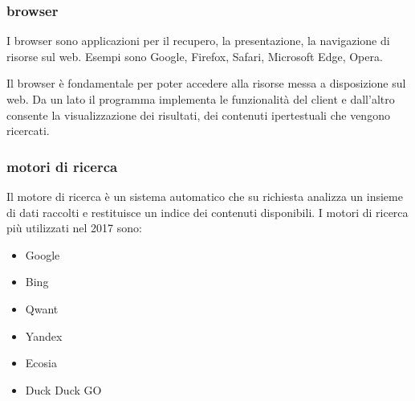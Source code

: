      
     \subsubsection{browser}
     I browser sono applicazioni per il recupero, la presentazione, la navigazione di risorse sul web. Esempi sono  Google, Firefox, Safari, Microsoft Edge, Opera.\par 
     Il browser è fondamentale per poter accedere alla risorse messa a disposizione sul web. Da un lato il programma implementa le funzionalità del client e dall'altro consente la visualizzazione dei risultati, dei contenuti ipertestuali che vengono ricercati.\par

     \subsubsection{motori di ricerca}
     Il motore di ricerca è un sistema automatico che su richiesta analizza un insieme di dati raccolti e restituisce un indice dei contenuti disponibili. I motori di ricerca più utilizzati nel 2017 sono:

     \begin{itemize}
         \item Google
         \item Bing
         \item Qwant
         \item Yandex
         \item Ecosia
         \item Duck Duck GO
     \end{itemize}
     
